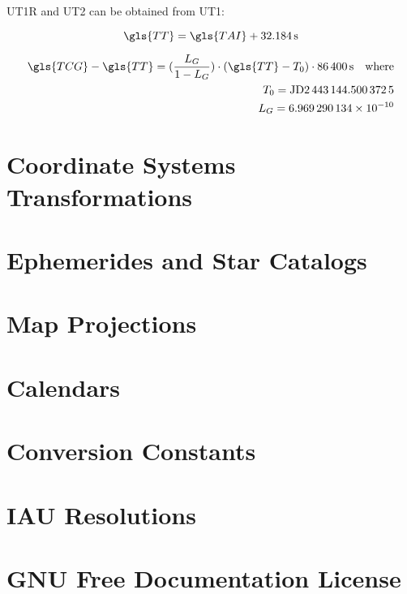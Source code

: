 \documentclass{report}
\begin{document}
\gls{UT1R} and \gls{UT2} can be obtained from \gls{UT1}:

\begin{equation}
	\gls{TT} = \gls{TAI} + \SI{32.184}{\second}
\end{equation}

\begin{align}
	\gls{TCG} - \gls{TT} =  (\frac {L_G}{1-L_G}) \cdot (\gls{TT} - T_0) \cdot \SI{86400}{\second} \quad \textrm{where}\\
	T_0 = \textrm{JD}\num{2443144.5003725}\\
	L_G = \num{6.969290134e-10}
\end{align}










\chapter{Coordinate Systems Transformations}\label{CoordinateSystemsTransformations}

\chapter{Ephemerides and Star Catalogs}\label{EphemeridesAndStarCatalogs}

\chapter{Map Projections}\label{MapProjections}

\chapter{Calendars}\label{Calendars}

\appendix
\chapter{Conversion Constants}\label{Conversion Constants}

\chapter{IAU Resolutions}\label{IAU Resolutions}
	
\chapter{GNU Free Documentation License}\label{License}



\printglossary
\end{document}
